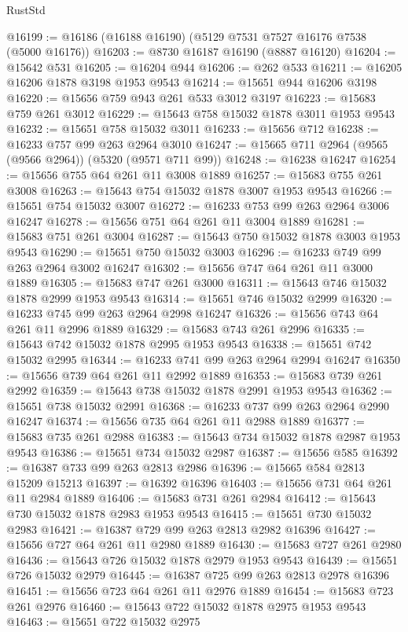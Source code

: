 \begin{lexlean}{RustStd}
\begin{coremodule}
@16199 := @16186 (@16188 @16190) (@5129 @7531 @7527 @16176 @7538 (@5000 @16176))
@16203 := @8730 @16187 @16190 (@8887 @16120)
@16204 := @15642 @531
@16205 := @16204 @944
@16206 := @262 @533
@16211 := @16205 @16206 @1878 @3198 @1953 @9543
@16214 := @15651 @944 @16206 @3198
@16220 := @15656 @759 @943 @261 @533 @3012 @3197
@16223 := @15683 @759 @261 @3012
@16229 := @15643 @758 @15032 @1878 @3011 @1953 @9543
@16232 := @15651 @758 @15032 @3011
@16233 := @15656 @712
@16238 := @16233 @757 @99 @263 @2964 @3010
@16247 := @15665 @711 @2964 (@9565 (@9566 @2964)) (@5320 (@9571 @711 @99))
@16248 := @16238 @16247
@16254 := @15656 @755 @64 @261 @11 @3008 @1889
@16257 := @15683 @755 @261 @3008
@16263 := @15643 @754 @15032 @1878 @3007 @1953 @9543
@16266 := @15651 @754 @15032 @3007
@16272 := @16233 @753 @99 @263 @2964 @3006 @16247
@16278 := @15656 @751 @64 @261 @11 @3004 @1889
@16281 := @15683 @751 @261 @3004
@16287 := @15643 @750 @15032 @1878 @3003 @1953 @9543
@16290 := @15651 @750 @15032 @3003
@16296 := @16233 @749 @99 @263 @2964 @3002 @16247
@16302 := @15656 @747 @64 @261 @11 @3000 @1889
@16305 := @15683 @747 @261 @3000
@16311 := @15643 @746 @15032 @1878 @2999 @1953 @9543
@16314 := @15651 @746 @15032 @2999
@16320 := @16233 @745 @99 @263 @2964 @2998 @16247
@16326 := @15656 @743 @64 @261 @11 @2996 @1889
@16329 := @15683 @743 @261 @2996
@16335 := @15643 @742 @15032 @1878 @2995 @1953 @9543
@16338 := @15651 @742 @15032 @2995
@16344 := @16233 @741 @99 @263 @2964 @2994 @16247
@16350 := @15656 @739 @64 @261 @11 @2992 @1889
@16353 := @15683 @739 @261 @2992
@16359 := @15643 @738 @15032 @1878 @2991 @1953 @9543
@16362 := @15651 @738 @15032 @2991
@16368 := @16233 @737 @99 @263 @2964 @2990 @16247
@16374 := @15656 @735 @64 @261 @11 @2988 @1889
@16377 := @15683 @735 @261 @2988
@16383 := @15643 @734 @15032 @1878 @2987 @1953 @9543
@16386 := @15651 @734 @15032 @2987
@16387 := @15656 @585
@16392 := @16387 @733 @99 @263 @2813 @2986
@16396 := @15665 @584 @2813 @15209 @15213
@16397 := @16392 @16396
@16403 := @15656 @731 @64 @261 @11 @2984 @1889
@16406 := @15683 @731 @261 @2984
@16412 := @15643 @730 @15032 @1878 @2983 @1953 @9543
@16415 := @15651 @730 @15032 @2983
@16421 := @16387 @729 @99 @263 @2813 @2982 @16396
@16427 := @15656 @727 @64 @261 @11 @2980 @1889
@16430 := @15683 @727 @261 @2980
@16436 := @15643 @726 @15032 @1878 @2979 @1953 @9543
@16439 := @15651 @726 @15032 @2979
@16445 := @16387 @725 @99 @263 @2813 @2978 @16396
@16451 := @15656 @723 @64 @261 @11 @2976 @1889
@16454 := @15683 @723 @261 @2976
@16460 := @15643 @722 @15032 @1878 @2975 @1953 @9543
@16463 := @15651 @722 @15032 @2975

\end{coremodule}
\end{lexlean}
